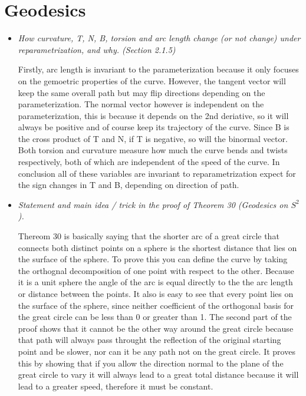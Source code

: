 \documentclass{article}
\begin{document}
\section*{Geodesics}

\begin{itemize}
      \item{} \emph{How curvature, T, N, B, torsion and arc length change (or not change) under reparametrization, and why. (Section 2.1.5) }

            \quad{} Firstly, arc length is invariant to the parameterization because it only focuses on the gemoetric properties
            of the curve. However, the tangent vector will keep the same overall path but may flip directions depending on the parameterization.
            The normal vector however is independent on the parameterization, this is because it depends on the 2nd deriative, so it will always
            be positive and of course keep its trajectory of the curve. Since B is the cross product of T and N, if T is negative, so will the binormal vector.
            Both torsion and curvature measure how much the curve bends and twists respectively, both of which are independent of the speed of the curve.
            In conclusion all of these variables are invariant to reparametrization expect for the sign changes in T and B, depending on direction of path.



            \vspace{0.5cm}

      \item{} \emph{Statement and main idea / trick in the proof of Theorem 30 (Geodesics on $S^2$).}

            \quad{} Thereom 30 is basically saying that the shorter arc of a great circle that connects both distinct points on a sphere is the shortest distance that lies on the surface of the sphere.
            To prove this you can define the curve by taking the orthognal decomposition of one point with respect to the other.
            Because it is a unit sphere the angle of the arc is equal directly to the the arc length or distance between the points.
            It also is easy to see that every point lies on the surface of the sphere, since neither coefficient of the orthogonal basis for the great circle can be less than 0 or  greater than 1.
            The second part of the proof shows that it cannot be the other way around the great circle because that path will always pass throught the reflection of the original starting point and be slower, nor can it be any path not on the great circle.
            It proves this by showing that if you allow the direction normal to the plane of the great circle to vary it will always lead to a great total distance because it will lead to a greater speed, therefore it must be constant.
\end{itemize}
\end{document}
